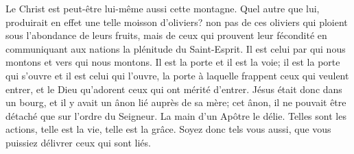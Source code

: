Le Christ est peut-être lui-même aussi cette montagne.
Quel autre que lui, produirait en effet une telle moisson d’oliviers?
	non pas de ces oliviers qui ploient sous l’abondance de leurs fruits,
	mais de ceux qui prouvent leur fécondité
	en communiquant aux nations la plénitude du Saint-Esprit.
Il est celui par qui nous montons et vers qui nous montons.
Il est la porte et il est la voie;
	il est la porte qui s’ouvre et il est celui qui l’ouvre,
	la porte à laquelle frappent ceux qui veulent entrer,
	et le Dieu qu’adorent ceux qui ont mérité d’entrer.
Jésus était donc dans un bourg, et il y avait un ânon lié auprès de sa mère;
	cet ânon, il ne pouvait être détaché que sur l’ordre du Seigneur.
La main d’un Apôtre le délie.
	Telles sont les actions, telle est la vie, telle est la grâce.
	Soyez donc tels vous aussi, que vous puissiez délivrer ceux qui sont liés.